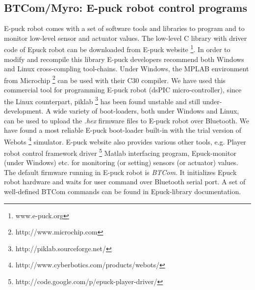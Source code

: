 \subsection{BTCom/Myro: E-puck robot control programs}
\label{expt-tools:btcom}

E-puck robot comes with a set of software tools and libraries to program and to monitor low-level sensor and actuator values. The low-level C library with driver code of Epuck robot can be downloaded from E-puck website \footnote{www.e-puck.org}. In order to modify and recompile this library E-puck developers recommend both Windows and Linux cross-compling tool-chains. Under Windows, the MPLAB  environment from Microchip \footnote{http://www.microchip.com} can be used with their C30 compiler. We have used this  commercial tool for programming E-puck robot (dsPIC micro-controller), since the Linux counterpart, piklab \footnote{http://piklab.sourceforge.net/} has been found unstable and still under-development. A wide variety of boot-loaders, both under Windows and Linux,  can be used to upload the {\em .hex} firmware files to E-puck robot over Bluetooth. We have found a most reliable E-puck boot-loader  built-in with the trial version  of Webots \footnote{http://www.cyberbotics.com/products/webots/} simulator.  E-puck website also provides various other tools, e.g. Player robot control framework driver \footnote{http://code.google.com/p/epuck-player-driver/} Matlab interfacing program, Epuck-monitor (under Windows) etc. for monitoring (or setting) sensors (or actuator) values.  The default firmware running in E-puck robot is {\em BTCom}.  It initializes  Epuck robot  hardware and waits for user command over Bluetooth serial port. A set of well-defined BTCom commands can be found in Epuck-library documentation. 

